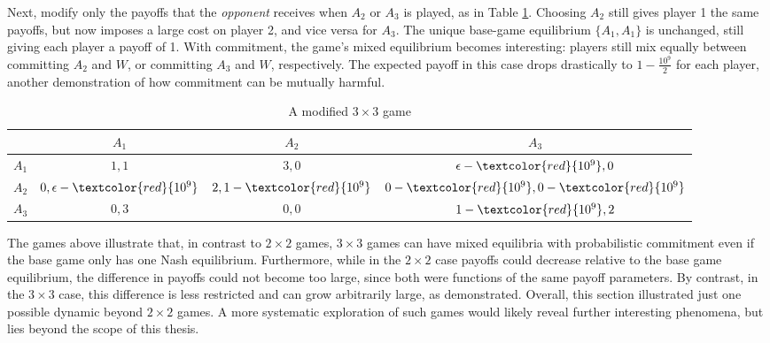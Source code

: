\documentclass[../paper.tex]{subfiles}
\begin{document}
Next, modify only the payoffs that the \textit{opponent} receives when $A_2$ or $A_3$ is played, as in Table \ref{tab:3x3modified}. Choosing $A_2$ still gives player 1 the same payoffs, but now imposes a large cost on player 2, and vice versa for $A_3$. The unique base-game equilibrium $\{A_1,A_1\}$ is unchanged, still giving each player a payoff of 1. With commitment, the game's mixed equilibrium becomes interesting: players still mix equally between committing $A_2$ and $W$, or committing $A_3$ and $W$, respectively. The expected payoff in this case drops drastically to $1 - \frac{10^9}{2}$ for each player, another demonstration of how commitment can be mutually harmful.
\begin{table}[h!]
\centering
\begin{tabular}{c|ccc}
    & $A_1$ & $A_2$ & $A_3$ \\
    \hline
    $A_1$ & $1,1$ & $3,0$ & $\epsilon -\textcolor{red}{10^{9}},0$ \\
    $A_2$ & $0,\epsilon-\textcolor{red}{10^{9}}$ & $2,1-\textcolor{red}{10^{9}}$ & $0-\textcolor{red}{10^{9}},0-\textcolor{red}{10^{9}}$ \\
    $A_3$ & $0,3$ & $0,0$ & $1-\textcolor{red}{10^{9}},2$ \\
\end{tabular}
\caption{A modified $3\times3$ game}
\label{tab:3x3modified}
\end{table}
\newline
The games above illustrate that, in contrast to $2\times2$ games, $3\times3$ games can have mixed equilibria with probabilistic commitment even if the base game only has one Nash equilibrium. 
Furthermore, while in the $2 \times 2$ case payoffs could decrease relative to the base game equilibrium, the difference in payoffs could not become too large, since both were functions of the same payoff parameters. By contrast, in the $3 \times 3$ case, this difference is less restricted and can grow arbitrarily large, as demonstrated.
Overall, this section illustrated just one possible dynamic beyond $2\times2$ games. A more systematic exploration of such games would likely reveal further interesting phenomena, but lies beyond the scope of this thesis.
\end{document}
